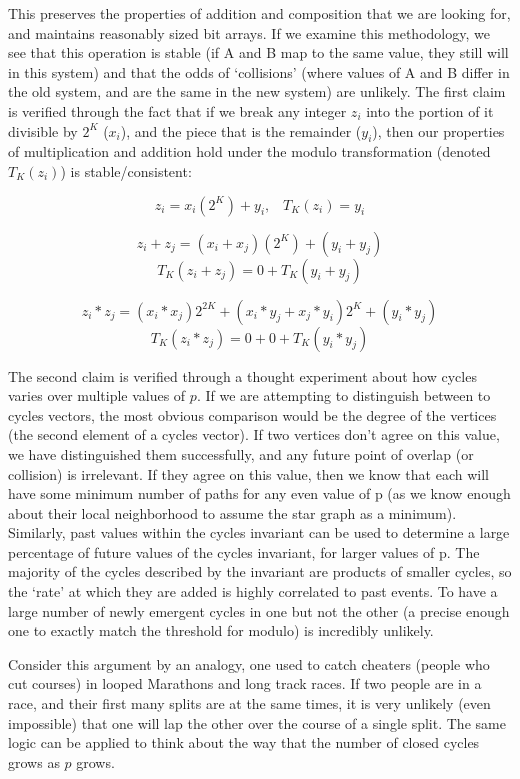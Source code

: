 This preserves the properties of addition and composition that we are looking for, and maintains reasonably sized bit arrays.
If we examine this methodology, we see that this operation is stable (if A and B map to the same value, they still will in this system) and that the odds of `collisions' (where values of A and B differ in the old system, and are the same in the new system) are unlikely.
The first claim is verified through the fact that if we break any integer $z_i$ into the portion of it divisible by $2^K$ ($x_i$), and the piece that is the remainder ($y_i$), then our properties of multiplication and addition hold under the modulo transformation (denoted $T_K(z_i)$) is stable/consistent:

$$z_i =  x_i(2^K) + y_i , \;\;\;T_K(z_i) = y_i$$

$$z_i + z_j = (x_i + x_j)(2^K) + (y_i + y_j)$$
$$T_K(z_i + z_j) = 0 + T_K(y_i + y_j)$$

$$z_i * z_j = (x_i*x_j)2^{2K} + (x_i*y_j + x_j*y_i)2^K + (y_i * y_j)$$
$$T_K(z_i * z_j) = 0 + 0 + T_K(y_i * y_j)$$

The second claim is verified through a thought experiment about how cycles varies over multiple values of $p$.
If we are attempting to distinguish between to cycles vectors, the most obvious comparison would be the degree of the vertices (the second element of a cycles vector).
If two vertices don't agree on this value, we have distinguished them successfully, and any future point of overlap (or collision) is irrelevant. 
If they agree on this value, then we know that each will have some minimum number of paths for any even value of p (as we know enough about their local neighborhood to assume the star graph as a minimum). 
Similarly, past values within the cycles invariant can be used to determine a large percentage of future values of the cycles invariant, for larger values of p.
The majority of the cycles described by the invariant are products of smaller cycles, so the `rate' at which they are added is highly correlated to past events.
To have a large number of newly emergent cycles in one but not the other (a precise enough one to exactly match the threshold for modulo) is incredibly unlikely.

Consider this argument by an analogy, one used to catch cheaters (people who cut courses) in looped Marathons and long track races.
If two people are in a race, and their first many splits are at the same times, it is very unlikely (even impossible) that one will lap the other over the course of a single split.
The same logic can be applied to think about the way that the number of closed cycles grows as $p$ grows.


